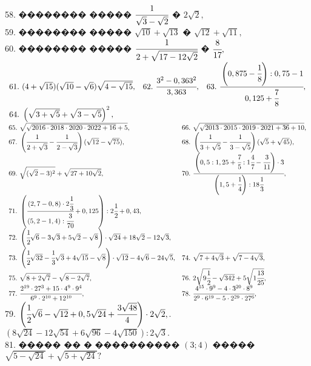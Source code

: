 \documentclass[12pt]{article}
\begin{document}
58. �������� ����� $\cfrac{1}{\sqrt{3}-\sqrt{2}}$ � $2\sqrt{2},$\\
59. �������� ����� $\sqrt{10}+\sqrt{13}$ � $\sqrt{12}+\sqrt{11},$\\
60. �������� ����� $\cfrac{1}{2+\sqrt{17-12\sqrt{2}}}$ � $\cfrac{8}{17},$\\
$\begin{array}{lll}
61.\ (4+\sqrt{15})(\sqrt{10}-\sqrt{6})\sqrt{4-\sqrt{15}},&
62.\ \cfrac{3^2-0,363^2}{3,363},&
63.\ \cfrac{\left(0,875-\cfrac{1}{8}\right):0,75-1}{0,125+\cfrac{7}{8}},\\
64.\ \left(\sqrt{3+\sqrt{5}}+\sqrt{3-\sqrt{5}}\right)^2,
\end{array}$\\
$\begin{array}{ll}
65.\ \sqrt{\sqrt{2016\cdot2018\cdot2020\cdot2022+16}+5},&
66.\ \sqrt{\sqrt{2013\cdot2015\cdot2019\cdot2021+36}+10},\\
67.\ \left(\cfrac{1}{2+\sqrt{3}}-\cfrac{1}{2-\sqrt{3}}\right)(\sqrt{12}-\sqrt{75}),&
68.\ \left(\cfrac{1}{3+\sqrt{5}}-\cfrac{1}{3-\sqrt{5}}\right)(\sqrt{5}+\sqrt{45}),\\
69.\ \sqrt{(\sqrt{2}-3)^2}+\sqrt{27+10\sqrt{2}},&
70.\ \cfrac{\left(0,5:1,25+\cfrac{7}{5}:1\cfrac{4}{7}-\cfrac{3}{11}\right)\cdot3}{\left(1,5+\cfrac{1}{4}\right):18\cfrac{1}{3}},\\
71.\ \left(\cfrac{(2,7-0,8)\cdot2\cfrac{1}{3}}{(5,2-1,4):\cfrac{3}{70}}+0,125\right):2\cfrac{1}{2}+0,43,\\
72.\ \left(\cfrac{1}{2}\sqrt{6}-3\sqrt{3}+5\sqrt{2}-\sqrt{8}\right)\cdot\sqrt{24}+18\sqrt{2}-12\sqrt{3},\\
73.\ \left(\cfrac{1}{2}\sqrt{32}-\cfrac{1}{3}\sqrt{3}+4\sqrt{15}-\sqrt{8}\right)\cdot\sqrt{12}-4\sqrt{6}-24\sqrt{5},&
74.\ \sqrt{7+4\sqrt{3}}+\sqrt{7-4\sqrt{3}},\\
75.\ \sqrt{8+2\sqrt{7}}-\sqrt{8-2\sqrt{7}},&
76.\ 2\sqrt{9\cfrac{1}{2}}-\sqrt{342}+5\sqrt{1\cfrac{13}{25}},\\
77.\ \cfrac{2^{19}\cdot27^3+15\cdot4^9\cdot9^4}{6^9\cdot2^{10}+12^{10}},&
78.\ \cfrac{4^{15}\cdot9^9-4\cdot3^{20}\cdot8^9}{2^9\cdot6^{19}-5\cdot2^{29}\cdot27^6},\end{array}$\\
79. $\left(\cfrac{1}{2}\sqrt{6}-\sqrt{12}+0,5\sqrt{24}+\cfrac{3\sqrt{48}}{4}\right)\cdot2\sqrt{2},$. $(8\sqrt{24}-12\sqrt{54}+6\sqrt{96}-4\sqrt{150}):2\sqrt{3}.$\\
81. ����� �� � ���������� $(3;4)$ ����� $\sqrt{5-\sqrt{24}}+\sqrt{5+\sqrt{24}}?$\\
\end{document}
